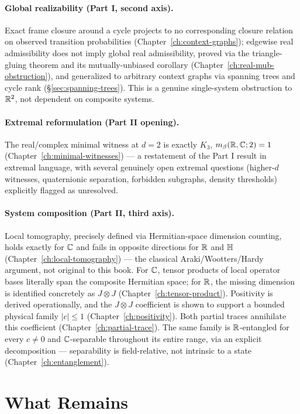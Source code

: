 \paragraph{Global realizability (Part I, second axis).} Exact frame closure
around a cycle projects to no corresponding closure relation on observed
transition probabilities (Chapter~\ref{ch:context-graphs}); edgewise real
admissibility does not imply global real admissibility, proved via the
triangle-gluing theorem and its mutually-unbiased corollary
(Chapter~\ref{ch:real-mub-obstruction}), and generalized to arbitrary context
graphs via spanning trees and cycle rank
(\S\ref{sec:spanning-trees}). This is a genuine single-system obstruction to
$\mathbb{R}^2$, not dependent on composite systems.

\paragraph{Extremal reformulation (Part II opening).} The real/complex
minimal witness at $d=2$ is exactly $K_3$, $m_\beta(\mathbb{R},\mathbb{C};2)=1$
(Chapter~\ref{ch:minimal-witnesses}) — a restatement of the Part I result in
extremal language, with several genuinely open extremal questions
(higher-$d$ witnesses, quaternionic separation, forbidden subgraphs, density
thresholds) explicitly flagged as unresolved.

\paragraph{System composition (Part II, third axis).} Local tomography,
precisely defined via Hermitian-space dimension counting, holds exactly for
$\mathbb{C}$ and fails in opposite directions for $\mathbb{R}$ and $\mathbb{H}$
(Chapter~\ref{ch:local-tomography}) — the classical Araki/Wootters/Hardy
argument, not original to this book. For $\mathbb{C}$, tensor products of local
operator bases literally span the composite Hermitian space; for $\mathbb{R}$, the
missing dimension is identified concretely as $J\otimes J$
(Chapter~\ref{ch:tensor-product}). Positivity is derived operationally, and
the $J\otimes J$ coefficient is shown to support a bounded physical family
$|c|\le1$ (Chapter~\ref{ch:positivity}). Both partial traces annihilate this
coefficient (Chapter~\ref{ch:partial-trace}). The same family is
$\mathbb{R}$-entangled for every $c\ne0$ and $\mathbb{C}$-separable throughout its entire
range, via an explicit decomposition — separability is field-relative, not
intrinsic to a state (Chapter~\ref{ch:entanglement}).

\section{What Remains}
\label{sec:what-remains}


